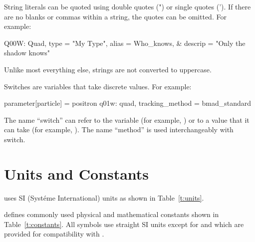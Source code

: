 {
String literals can be quoted using double quotes (") or single quotes ('). 
If there are no
blanks or commas within a string, the quotes can be omitted. For example:
\begin{example}
  Q00W: Quad, type = "My Type", alias = Who_knows, &
                                  descrip = "Only the shadow knows"
\end{example}
Unlike most everything else, strings are not converted to uppercase.

Switches are variables that take discrete values. For example:
\begin{example}
  parameter[particle] = positron          
  q01w: quad, tracking_method = bmad_standard 
\end{example}
The name ``switch'' can refer to the variable (for example,
) or to a value that it can take (for example,
). The name ``method'' is used interchangeably with switch.

\section{Units and Constants}
\label{s:constants}

\bmad uses SI (Syst\'eme International) units as shown in
Table~\ref{t:units}.

\bmad defines commonly used physical and mathematical constants
shown in Table~\ref{t:constants}.  All symbols use straight SI units
except for  and  which are provided for
compatibility with \mad.

}
